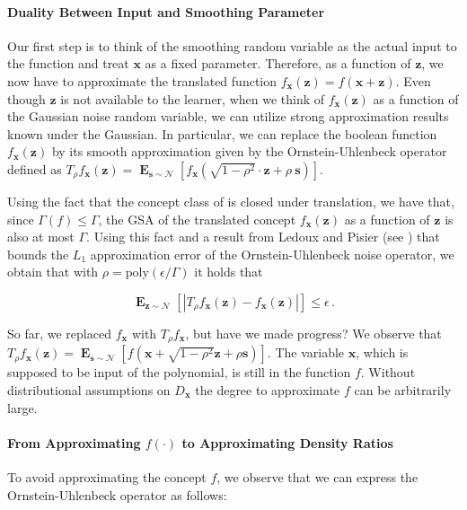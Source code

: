 \documentclass[10pt,a4paper]{article}
\renewcommand\vec[1]{\mathbf{#1}}
\DeclareMathOperator*{\E}{\mathbf{E}}
\newcommand{\1}{\Ind}
\newcommand{\x}{\vec x}
\begin{document}
\paragraph{Duality Between Input and Smoothing Parameter}

Our first step is to think of the smoothing random variable as the actual input to the function and treat $\mathbf{x}$ as a fixed parameter. Therefore, as a function of $\mathbf{z}$, we now have to approximate the translated function $f_{\mathbf{x}}(\mathbf{z}) = f(\mathbf{x} + \mathbf{z})$. Even though $\mathbf{z}$ is not available to the learner, when we think of $f_{\mathbf{x}}(\mathbf{z})$ as a function of the Gaussian noise random variable, we can utilize strong approximation results known under the Gaussian. In particular, we can replace the boolean function $f_{\mathbf{x}}(\vec{z})$ by its smooth approximation given by the Ornstein-Uhlenbeck operator defined as $T_{\rho} f_{\mathbf{x}}(\mathbf{z})=\E_{\vec{s} \sim \mathcal{N}}[f_{\mathbf{x}}(\sqrt{1-\rho^2} \cdot \mathbf{z} + \rho ~ \vec{s} )]$.

Using the fact that the concept class of  is closed under translation, we have that, since $\Gamma(f) \leq \Gamma$, the GSA of the translated concept $f_{\mathbf{x}}(\mathbf{z})$ as a function of $\mathbf{z}$ is also at most $\Gamma$. Using this fact and a result from Ledoux and Pisier (see ) that bounds the $L_1$ approximation error of the Ornstein-Uhlenbeck noise operator, we obtain that with $\rho = \text{poly}(\epsilon/\Gamma)$ it holds that 

\[
\E_{\mathbf{z} \sim \mathcal{N}}[|T_\rho f_{\mathbf{x}}(\mathbf{z}) - f_{\mathbf{x}}(\mathbf{z})|] \leq \epsilon \,.
\]

So far, we replaced $f_{\mathbf{x}}$ with $T_\rho f_{\mathbf{x}}$, but have we made progress? We observe that $T_\rho f_{\mathbf{x}}(\mathbf{z}) = \E_{\vec{s} \sim \mathcal{N}}[f(\mathbf{x} + \sqrt{1-\rho^2} \mathbf{z} + \rho \vec{s})]$. The variable $\mathbf{x}$, which is supposed to be input of the polynomial, is still in the function $f$. Without distributional assumptions on $D_{\x}$ the degree to approximate $f$ can be arbitrarily large.

\paragraph{From Approximating $f(\cdot)$ to Approximating Density Ratios}

To avoid approximating the concept $f$, we observe that we can express the Ornstein-Uhlenbeck operator as follows:
\end{document}
